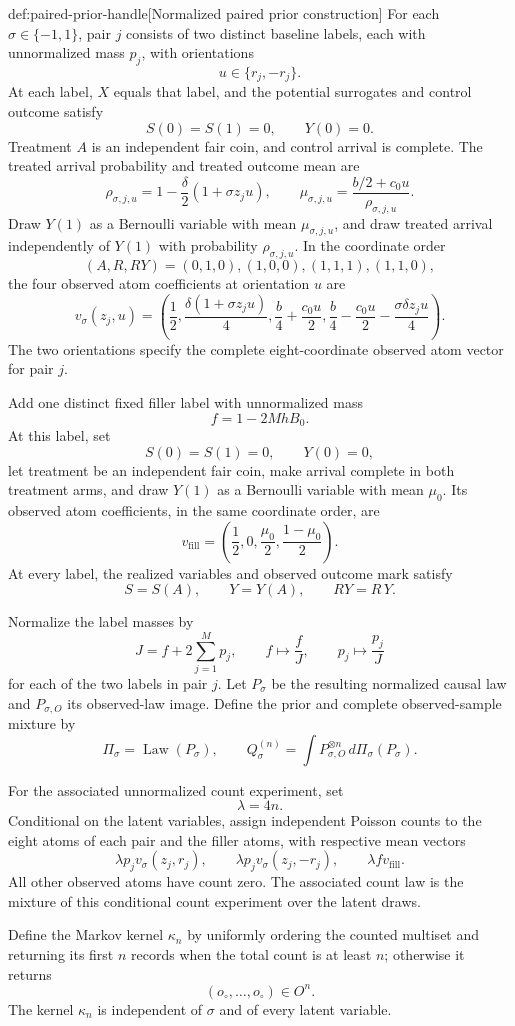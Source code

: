 \documentclass[11pt]{article}
\begin{document}
\begin{definitionv}{def:paired-prior-handle}[Normalized paired prior construction]
For each \(\sigma\in\{-1,1\}\), pair \(j\) consists of two distinct baseline labels, each with unnormalized mass \(p_j\), with orientations
\[
u\in\{r_j,-r_j\}.
\]
At each label, \(X\) equals that label, and the potential surrogates and control outcome satisfy
\[
S(0)=S(1)=0,\qquad Y(0)=0.
\]
Treatment \(A\) is an independent fair coin, and control arrival is complete. The treated arrival probability and treated outcome mean are
\[
\rho_{\sigma,j,u}
=1-\frac{\delta}{2}(1+\sigma z_ju),
\qquad
\mu_{\sigma,j,u}
=\frac{b/2+c_0u}{\rho_{\sigma,j,u}}.
\]
Draw \(Y(1)\) as a Bernoulli variable with mean \(\mu_{\sigma,j,u}\), and draw treated arrival independently of \(Y(1)\) with probability \(\rho_{\sigma,j,u}\). In the coordinate order
\[
(A,R,RY)=(0,1,0),(1,0,0),(1,1,1),(1,1,0),
\]
the four observed atom coefficients at orientation \(u\) are
\[
v_{\sigma}(z_j,u)
=
\left(
\frac12,
\frac{\delta(1+\sigma z_ju)}4,
\frac b4+\frac{c_0u}{2},
\frac b4-\frac{c_0u}{2}-\frac{\sigma\delta z_ju}{4}
\right).
\]
The two orientations specify the complete eight-coordinate observed atom vector for pair \(j\).

Add one distinct fixed filler label with unnormalized mass
\[
f=1-2MhB_0.
\]
At this label, set
\[
S(0)=S(1)=0,\qquad Y(0)=0,
\]
let treatment be an independent fair coin, make arrival complete in both treatment arms, and draw \(Y(1)\) as a Bernoulli variable with mean \(\mu_0\). Its observed atom coefficients, in the same coordinate order, are
\[
v_{\mathrm{fill}}
=\left(\frac12,0,\frac{\mu_0}{2},\frac{1-\mu_0}{2}\right).
\]
At every label, the realized variables and observed outcome mark satisfy
\[
S=S(A),\qquad Y=Y(A),\qquad RY=R\,Y.
\]

Normalize the label masses by
\[
J=f+2\sum_{j=1}^{M}p_j,
\qquad
f\longmapsto\frac fJ,
\qquad
p_j\longmapsto\frac{p_j}{J}
\]
for each of the two labels in pair \(j\). Let \(P_{\sigma}\) be the resulting normalized causal law and \(P_{\sigma,O}\) its observed-law image. Define the prior and complete observed-sample mixture by
\[
\Pi_{\sigma}=\operatorname{Law}(P_{\sigma}),
\qquad
Q_{\sigma}^{(n)}
=\int P_{\sigma,O}^{\otimes n}\,d\Pi_{\sigma}(P_{\sigma}).
\]

For the associated unnormalized count experiment, set
\[
\lambda=4n.
\]
Conditional on the latent variables, assign independent Poisson counts to the eight atoms of each pair and the filler atoms, with respective mean vectors
\[
\lambda p_jv_{\sigma}(z_j,r_j),
\qquad
\lambda p_jv_{\sigma}(z_j,-r_j),
\qquad
\lambda f v_{\mathrm{fill}}.
\]
All other observed atoms have count zero. The associated count law is the mixture of this conditional count experiment over the latent draws.

Define the Markov kernel \(\kappa_n\) by uniformly ordering the counted multiset and returning its first \(n\) records when the total count is at least \(n\); otherwise it returns
\[
(o_{\circ},\ldots,o_{\circ})\in O^n.
\]
The kernel \(\kappa_n\) is independent of \(\sigma\) and of every latent variable.
\end{definitionv}
\end{document}
